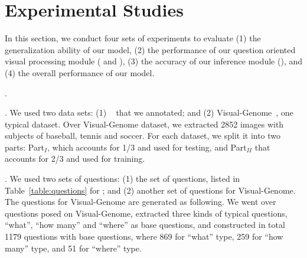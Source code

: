 
\section{Experimental Studies}
\label{sec-expt}

In this section, we conduct four sets of experiments to evaluate (1) the generalization ability of our model, (2) the performance of our question oriented visual processing module ( and ), (3) the accuracy of our inference module (), and (4) the overall performance of our model. 

. %

. We used two data sets: (1) ~\cite{peixi2019} that we annotated; and (2) Visual-Genome~\cite{visualgenome}, one typical \vqa dataset. Over Visual-Genome dataset, we extracted 2852 images with subjects of baseball, tennis and soccer. 
For each dataset, we split it into two parts: Part$_I$, which accounts for 1/3 and used for testing, and Part$_{II}$ that accounts for 2/3 and used for training.   

. We used two sets of questions: (1) the set of questions, listed in Table~\ref{table:questions} for ; and (2) another set of questions for Visual-Genome. The questions for Visual-Genome are generated as following. We went over questions posed on Visual-Genome, extracted three kinds of typical questions, \ie ``what'', ``how many'' and ``where'' as base questions, and constructed in total 1179 questions with base questions, where 869 for ``what'' type, 259 for ``how many'' type, and 51 for ``where'' type. 

